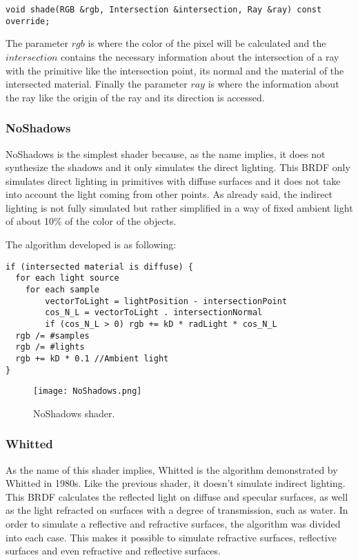 \begin{lstlisting}
void shade(RGB &rgb, Intersection &intersection, Ray &ray) const override;
\end{lstlisting}

\par
The parameter
$rgb$
is where the color of the pixel will be calculated and the
$intersection$
contains the necessary information about the intersection of a ray with the primitive like the intersection point, its normal and the material of the intersected material.
Finally the parameter
$ray$
is where the information about the ray like the origin of the ray and its direction is accessed.

\subsubsection{NoShadows}

\par
NoShadows is the simplest shader because, as the name implies, it does not synthesize the shadows and it only simulates the direct lighting.
This BRDF only simulates direct lighting in primitives with diffuse surfaces and it does not take into account the light coming from other points.
As already said, the indirect lighting is not fully simulated but rather simplified in a way of fixed ambient light of about 10\% of the color of the objects.

\par
The algorithm developed is as following:

\begin{lstlisting}
if (intersected material is diffuse) {
  for each light source
  	for each sample
	    vectorToLight = lightPosition - intersectionPoint
	    cos_N_L = vectorToLight . intersectionNormal
	    if (cos_N_L > 0) rgb += kD * radLight * cos_N_L
  rgb /= #samples
  rgb /= #lights
  rgb += kD * 0.1 //Ambient light
}
\end{lstlisting}

\begin{figure}[H]
	\centering
	\caption{NoShadows shader.}
	\label{NoShadows shader.}
	\texttt{[image: NoShadows.png]}
\end{figure}

\subsubsection{Whitted}

\par
As the name of this shader implies, Whitted is the algorithm demonstrated by Whitted in 1980s.
Like the previous shader, it doesn't simulate indirect lighting.
This BRDF calculates the reflected light on diffuse and specular surfaces, as well as the light refracted on surfaces with a degree of transmission, such as water.
In order to simulate a reflective and refractive surfaces, the algorithm was divided into each case.
This makes it possible to simulate refractive surfaces, reflective surfaces and even refractive and reflective surfaces.

